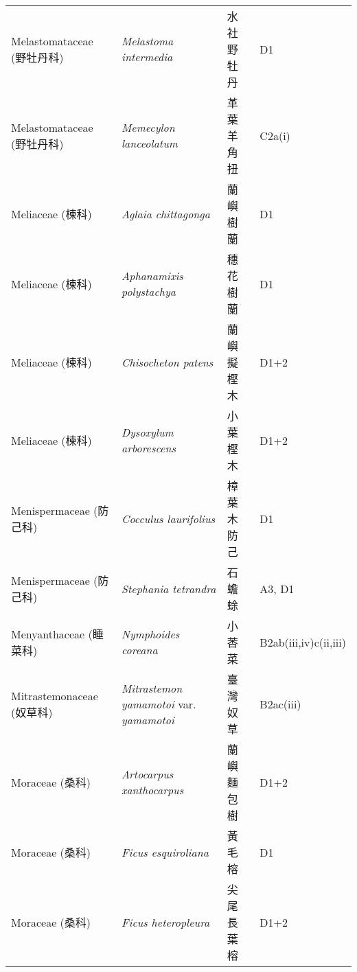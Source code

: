 \begin{longtable}{p{3cm}p{5cm}p{3cm}p{4cm}}
    Melastomataceae (野牡丹科) & \textit{Melastoma intermedia}  & 水社野牡丹 & D1 \index{Melastoma@\textit{Melastoma}!intermedia@\textit{intermedia}}  \index{水社野牡丹} \\
    Melastomataceae (野牡丹科) & \textit{Memecylon lanceolatum}  & 革葉羊角扭 & C2a(i) \index{Memecylon@\textit{Memecylon}!lanceolatum@\textit{lanceolatum}}  \index{革葉羊角扭} \\
    Meliaceae (楝科) & \textit{Aglaia chittagonga}  & 蘭嶼樹蘭 & D1 \index{Aglaia@\textit{Aglaia}!chittagonga@\textit{chittagonga}}  \index{蘭嶼樹蘭} \\
    Meliaceae (楝科) & \textit{Aphanamixis polystachya}  & 穗花樹蘭 & D1 \index{Aphanamixis@\textit{Aphanamixis}!polystachya@\textit{polystachya}}  \index{穗花樹蘭} \\
    Meliaceae (楝科) & \textit{Chisocheton patens}  & 蘭嶼擬樫木 & D1+2 \index{Chisocheton@\textit{Chisocheton}!patens@\textit{patens}}  \index{蘭嶼擬樫木} \\
    Meliaceae (楝科) & \textit{Dysoxylum arborescens}  & 小葉樫木 & D1+2 \index{Dysoxylum@\textit{Dysoxylum}!arborescens@\textit{arborescens}}  \index{小葉樫木} \\
    Menispermaceae (防己科) & \textit{Cocculus laurifolius}  & 樟葉木防己 & D1 \index{Cocculus@\textit{Cocculus}!laurifolius@\textit{laurifolius}}  \index{樟葉木防己} \\
    Menispermaceae (防己科) & \textit{Stephania tetrandra}  & 石蟾蜍 & A3, D1 \index{Stephania@\textit{Stephania}!tetrandra@\textit{tetrandra}}  \index{石蟾蜍} \\
    Menyanthaceae (睡菜科) & \textit{Nymphoides coreana}  & 小莕菜 & B2ab(iii,iv)c(ii,iii) \index{Nymphoides@\textit{Nymphoides}!coreana@\textit{coreana}}  \index{小莕菜} \\
    Mitrastemonaceae (奴草科) & \textit{Mitrastemon yamamotoi} var. \textit{yamamotoi}  & 臺灣奴草 & B2ac(iii) \index{Mitrastemon@\textit{Mitrastemon}!yamamotoi@\textit{yamamotoi}!var. yamamotoi@var. \textit{yamamotoi}}  \index{臺灣奴草} \\
    Moraceae (桑科) & \textit{Artocarpus xanthocarpus}  & 蘭嶼麵包樹 & D1+2 \index{Artocarpus@\textit{Artocarpus}!xanthocarpus@\textit{xanthocarpus}}  \index{蘭嶼麵包樹} \\
    Moraceae (桑科) & \textit{Ficus esquiroliana}  & 黃毛榕 & D1 \index{Ficus@\textit{Ficus}!esquiroliana@\textit{esquiroliana}}  \index{黃毛榕} \\
    Moraceae (桑科) & \textit{Ficus heteropleura}  & 尖尾長葉榕 & D1+2 \index{Ficus@\textit{Ficus}!heteropleura@\textit{heteropleura}}  \index{尖尾長葉榕} \\

\end{longtable}
